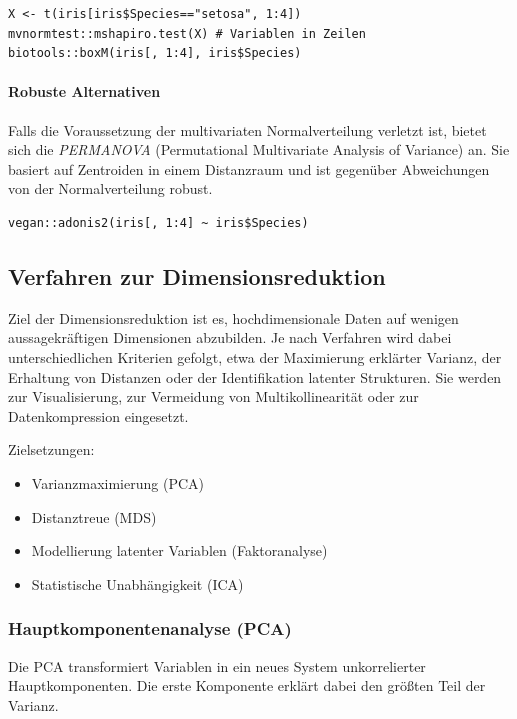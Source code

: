 \documentclass[10pt,twocolumn]{scrartcl}
\begin{document}
\begin{lstlisting}
X <- t(iris[iris$Species=="setosa", 1:4])
mvnormtest::mshapiro.test(X) # Variablen in Zeilen
biotools::boxM(iris[, 1:4], iris$Species)
\end{lstlisting}

\paragraph{Robuste Alternativen}

Falls die Voraussetzung der multivariaten Normalverteilung verletzt ist, bietet sich die \emph{PERMANOVA} (Permutational Multivariate Analysis of Variance) an. Sie basiert auf Zentroiden in einem Distanzraum und ist gegenüber Abweichungen von der Normalverteilung robust.

\begin{lstlisting}
vegan::adonis2(iris[, 1:4] ~ iris$Species)
\end{lstlisting}


\subsection{Verfahren zur Dimensionsreduktion}

Ziel der Dimensionsreduktion ist es, hochdimensionale Daten auf wenigen aussagekräftigen Dimensionen abzubilden. Je nach Verfahren wird dabei unterschiedlichen Kriterien gefolgt, etwa der Maximierung erklärter Varianz, der Erhaltung von Distanzen oder der Identifikation latenter Strukturen. Sie werden zur Visualisierung, zur Vermeidung von Multikollinearität oder zur Datenkompression eingesetzt.

Zielsetzungen:
\begin{itemize}
\item Varianzmaximierung (PCA)
\item Distanztreue (MDS)
\item Modellierung latenter Variablen (Faktoranalyse)
\item Statistische Unabhängigkeit (ICA)
\end{itemize}

\subsubsection{Hauptkomponentenanalyse (PCA)}

Die PCA transformiert Variablen in ein neues System unkorrelierter Hauptkomponenten. Die erste Komponente erklärt dabei den größten Teil der Varianz.
\end{document}
